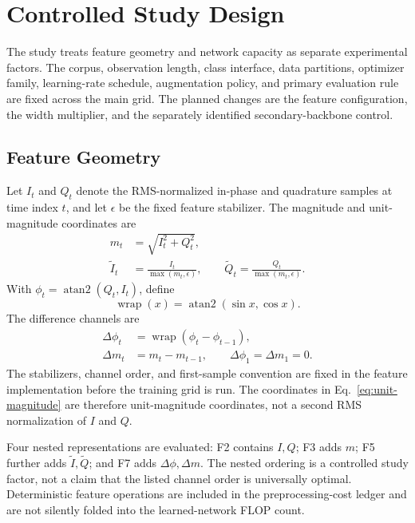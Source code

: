 \section{Controlled Study Design}
\label{sec:method}
The study treats feature geometry and network capacity as separate experimental
factors. The corpus, observation length, class interface, data partitions,
optimizer family, learning-rate schedule, augmentation policy, and primary
evaluation rule are fixed across the main grid. The planned changes are the
feature configuration, the width multiplier, and the separately identified
secondary-backbone control.

\subsection{Feature Geometry}
Let $I_t$ and $Q_t$ denote the RMS-normalized in-phase and quadrature samples
at time index $t$, and let $\epsilon$ be the fixed feature stabilizer. The
magnitude and unit-magnitude coordinates are
\begin{equation}
\begin{aligned}
 m_t &= \sqrt{I_t^2+Q_t^2},\\
 \tilde I_t &= \frac{I_t}{\max(m_t,\epsilon)}, \qquad
 \tilde Q_t = \frac{Q_t}{\max(m_t,\epsilon)}.
\end{aligned}
\label{eq:unit-magnitude}
\end{equation}
With $\phi_t=\operatorname{atan2}(Q_t,I_t)$, define
\[
\operatorname{wrap}(x)=\operatorname{atan2}(\sin x,\cos x).
\]
The difference channels are
\begin{equation}
\begin{aligned}
 \Delta\phi_t &= \operatorname{wrap}(\phi_t-\phi_{t-1}),\\
 \Delta m_t &= m_t-m_{t-1}, \qquad
 \Delta\phi_1=\Delta m_1=0.
\end{aligned}
\label{eq:feature-differences}
\end{equation}
The stabilizers, channel order, and first-sample convention are fixed in the
feature implementation before the training grid is run. The coordinates in
Eq.~\eqref{eq:unit-magnitude} are therefore unit-magnitude coordinates, not a
second RMS normalization of $I$ and $Q$.

Four nested representations are evaluated: F2 contains $I,Q$; F3 adds $m$;
F5 further adds $\tilde I,\tilde Q$; and F7 adds $\Delta\phi,\Delta m$. The
nested ordering is a controlled study factor, not a claim that the listed
channel order is universally optimal. Deterministic feature operations are
included in the preprocessing-cost ledger and are not silently folded into
the learned-network FLOP count.

